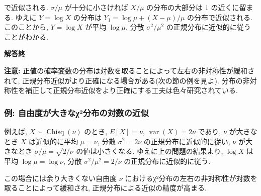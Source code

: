 \documentclass[
  letterpaper,
  DIV=11,
  numbers=noendperiod]{scrartcl}
\begin{document}
で近似される. \(\sigma/\mu\) が十分に小さければ \(X/\mu\)
の分布の大部分は \(1\) の近くに留まる. ゆえに \(Y=\log X\) の分布は
\(Y_1 = \log\mu + (X-\mu)/\mu\) の分布で近似される. このことから,
\(Y=\log X\) が平均 \(\log\mu\), 分散 \(\sigma^2/\mu^2\)
の正規分布に近似的に従うことがわかる.

\textbf{解答終}

\textbf{注意:}
正値の確率変数の分布は対数を取ることによって左右の非対称性が緩和されて,
正規分布近似がより正確になる場合がある(次の節の例を見よ).
分布の非対称性を補正して正規分布近似をより正確にする工夫は色々研究されている.

\hypertarget{ux4f8b-ux81eaux7531ux5ea6ux304cux5927ux304dux306aux3c7uxb2ux5206ux5e03ux306eux5bfeux6570ux306eux8fd1ux4f3c}{%
\subsubsection{例:
自由度が大きなχ²分布の対数の近似}\label{ux4f8b-ux81eaux7531ux5ea6ux304cux5927ux304dux306aux3c7uxb2ux5206ux5e03ux306eux5bfeux6570ux306eux8fd1ux4f3c}}

例えば, \(X \sim \operatorname{Chisq}(\nu)\) のとき, \(E[X]=\nu\),
\(\operatorname{var}(X)=2\nu\) であり, \(\nu\) が大きなとき \(X\)
は近似的に平均 \(\mu=\nu\), 分散 \(\sigma^2=2\nu\)
の正規分布に近似的に従い, \(\nu\) が大きなとき
\(\sigma/\mu = \sqrt{2/\nu}\) の値は小さくなる.
ゆえに上の問題の結果より, \(\log X\) は平均 \(\log\mu = \log\nu\), 分散
\(\sigma^2/\mu^2 = 2/\nu\) の正規分布に近似的に従う.

この場合には余り大きくない自由度 \(\nu\)
におけるχ²分布の左右の非対称性が対数を取ることによって緩和され,
正規分布による近似の精度が高まる.
\end{document}
